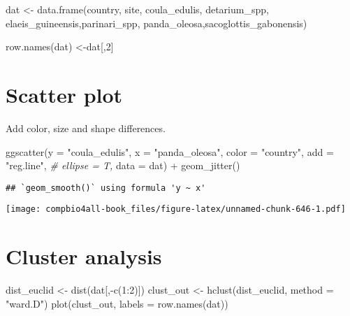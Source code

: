 \documentclass[
]{book}
\newenvironment{Shaded}{\begin{snugshade}}{\end{snugshade}}
\newcommand{\AttributeTok}[1]{\textcolor[rgb]{0.77,0.63,0.00}{#1}}
\newcommand{\CommentTok}[1]{\textcolor[rgb]{0.56,0.35,0.01}{\textit{#1}}}
\newcommand{\DecValTok}[1]{\textcolor[rgb]{0.00,0.00,0.81}{#1}}
\newcommand{\FunctionTok}[1]{\textcolor[rgb]{0.00,0.00,0.00}{#1}}
\newcommand{\NormalTok}[1]{#1}
\newcommand{\OtherTok}[1]{\textcolor[rgb]{0.56,0.35,0.01}{#1}}
\newcommand{\SpecialCharTok}[1]{\textcolor[rgb]{0.00,0.00,0.00}{#1}}
\newcommand{\StringTok}[1]{\textcolor[rgb]{0.31,0.60,0.02}{#1}}
\begin{document}
\begin{Shaded}
\begin{Highlighting}[]
\NormalTok{dat }\OtherTok{\textless{}{-}} \FunctionTok{data.frame}\NormalTok{(country,}
\NormalTok{                  site,}
\NormalTok{                   coula\_edulis,}
\NormalTok{                   detarium\_spp,}
\NormalTok{                   elaeis\_guineensis,parinari\_spp,}
\NormalTok{                   panda\_oleosa,sacoglottis\_gabonensis)}

\FunctionTok{row.names}\NormalTok{(dat) }\OtherTok{\textless{}{-}}\NormalTok{dat[,}\DecValTok{2}\NormalTok{]}
\end{Highlighting}
\end{Shaded}

\hypertarget{scatter-plot}{%
\section{Scatter plot}\label{scatter-plot}}

Add color, size and shape differences.

\begin{Shaded}
\begin{Highlighting}[]
\FunctionTok{ggscatter}\NormalTok{(}\AttributeTok{y =} \StringTok{"coula\_edulis"}\NormalTok{,}
          \AttributeTok{x =} \StringTok{"panda\_oleosa"}\NormalTok{,}
          \AttributeTok{color =} \StringTok{"country"}\NormalTok{,}
          \AttributeTok{add =} \StringTok{"reg.line"}\NormalTok{,}
          \CommentTok{\# ellipse = T, }
          \AttributeTok{data =}\NormalTok{ dat) }\SpecialCharTok{+} \FunctionTok{geom\_jitter}\NormalTok{()}
\end{Highlighting}
\end{Shaded}

\begin{verbatim}
## `geom_smooth()` using formula 'y ~ x'
\end{verbatim}

\texttt{[image: compbio4all-book\_files/figure-latex/unnamed-chunk-646-1.pdf]}

\hypertarget{cluster-analysis}{%
\section{Cluster analysis}\label{cluster-analysis}}

\begin{Shaded}
\begin{Highlighting}[]
\NormalTok{dist\_euclid }\OtherTok{\textless{}{-}} \FunctionTok{dist}\NormalTok{(dat[,}\SpecialCharTok{{-}}\FunctionTok{c}\NormalTok{(}\DecValTok{1}\SpecialCharTok{:}\DecValTok{2}\NormalTok{)])}
\NormalTok{clust\_out }\OtherTok{\textless{}{-}} \FunctionTok{hclust}\NormalTok{(dist\_euclid,}
                    \AttributeTok{method =} \StringTok{"ward.D"}\NormalTok{) }
\FunctionTok{plot}\NormalTok{(clust\_out,}
     \AttributeTok{labels =} \FunctionTok{row.names}\NormalTok{(dat))}
\end{Highlighting}
\end{Shaded}
\end{document}
